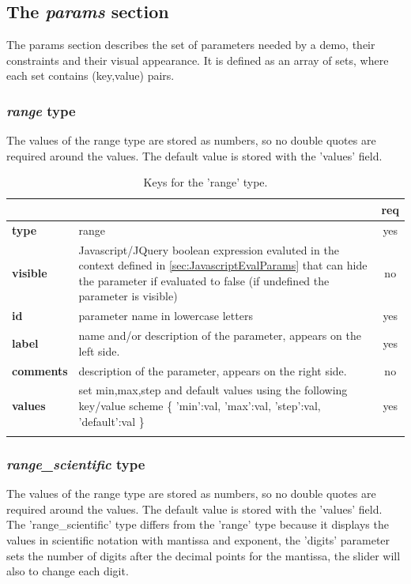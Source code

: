 \subsection{The \emph{params} section}
The params section describes the set of parameters needed by a demo, their 
constraints and their visual appearance. It is defined as an array of sets, 
where each set contains (key,value) pairs.


\subsubsection{ \emph{range} type}

The values of the range type are stored as numbers, so no double quotes are 
required around the values. The default value is stored with the 'values' field.

\begin{longtable}{|>{\bf}L{\linewidth}|L{\linewidth}|c|}
\hline
      &  & {\bf req} 
\tabularnewline \hline \hline
 type  & range       & yes \\ \hline
 visible  & Javascript/JQuery boolean expression evaluted in the context defined 
              in \ref{sec:JavascriptEvalParams} that can hide the parameter if
            evaluated to false (if undefined the parameter is visible)& no \\ \hline
 id     & parameter name in lowercase letters  & yes \\ \hline
 label  & name and/or description of the parameter, appears on the left side. & yes
                      \\ \hline
 comments & description of the parameter, appears on the right side. & no
                      \\ \hline
 values & set min,max,step and default values using the following key/value 
scheme \{ 'min':val, 'max':val, 'step':val, 'default':val \} & yes
                      \\ \hline
\caption{Keys for the 'range' type.}
\end{longtable}

\subsubsection{ \emph{range\_scientific} type}

The values of the range type are stored as numbers, so no double quotes are 
required around the values. The default value is stored with the 'values' field.
The 'range\_scientific' type differs from the 'range' type because it displays
the values in scientific notation with mantissa and exponent, the 'digits' parameter
sets the number of digits after the decimal points for the mantissa, the slider
will also to change each digit.

